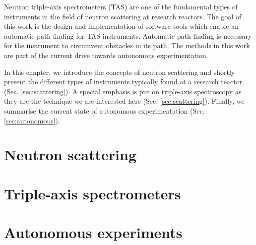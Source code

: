 Neutron triple-axis spectrometers (TAS) are one of the fundamental types of instruments in the field of neutron scattering at research reactors. The goal of this work is the design and implementation of software tools which enable an automatic path finding for TAS instruments. Automatic path finding is necessary for the instrument to circumvent obstacles in its path. The methods in this work are part of the current drive towards autonomous experimentation.

In this chapter, we introduce the concepts of neutron scattering and shortly present the different types of instruments typically found at a research reactor (Sec. \ref{sec:scattering}). A special emphasis is put on triple-axis spectroscopy as they are the technique we are interested here (Sec. \ref{sec:scattering}). Finally, we summarise the current state of autonomous experimentation (Sec. \ref{sec:autonomous}).



\section{Neutron scattering \label{sec:scattering}}



\section{Triple-axis spectrometers \label{sec:tas}}



\section{Autonomous experiments \label{sec:autonomous}}
